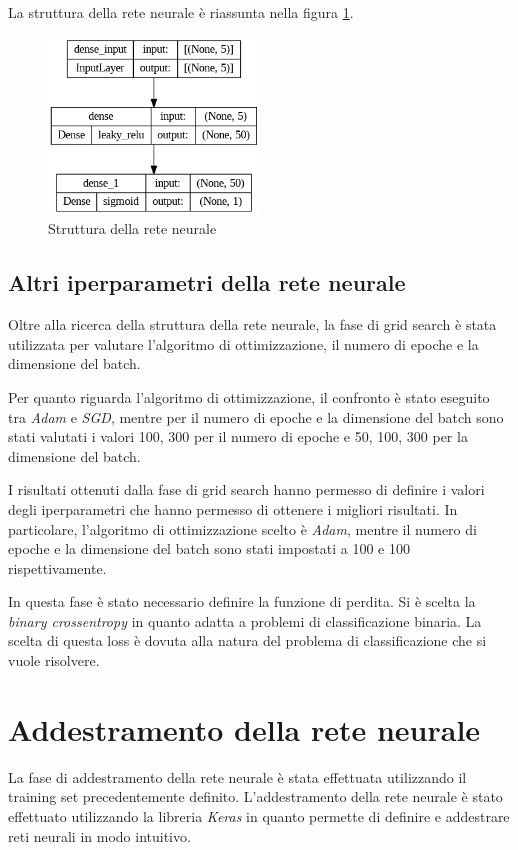 La struttura della rete neurale è riassunta nella figura \ref{fig:strutturaReteNeurale}.
\begin{figure}[!ht]
    \centering
    \includegraphics[width=0.5\textwidth]{img/rete/struttura_rete.png}
    \caption{Struttura della rete neurale}
    \label{fig:strutturaReteNeurale}
\end{figure}
\subsection*{Altri iperparametri della rete neurale} %
Oltre alla ricerca della struttura della rete neurale, la fase di grid search è
stata utilizzata per valutare l'algoritmo di ottimizzazione, il numero di epoche
e la dimensione del batch.

Per quanto riguarda l'algoritmo di ottimizzazione, il confronto è stato eseguito
tra \textit{Adam} e \textit{SGD}, mentre per il numero di epoche e la dimensione
del batch sono stati valutati i valori 100, 300 per il numero di epoche e 50,
100, 300 per la dimensione del batch.

I risultati ottenuti dalla fase di grid search hanno permesso di definire i valori
degli iperparametri che hanno permesso di ottenere i migliori risultati. In
particolare, l'algoritmo di ottimizzazione scelto è \textit{Adam}, mentre il
numero di epoche e la dimensione del batch sono stati impostati a 100 e 100
rispettivamente.

In questa fase è stato necessario definire la funzione di perdita. Si è scelta 
la \textit{binary crossentropy} in quanto adatta a problemi di classificazione 
binaria. La scelta di questa loss è dovuta alla natura del problema di 
classificazione che si vuole risolvere.
\section{Addestramento della rete neurale}
La fase di addestramento della rete neurale è stata effettuata utilizzando il
training set precedentemente definito. L'addestramento della rete neurale è stato 
effettuato utilizzando la libreria \textit{Keras} in quanto permette di definire 
e addestrare reti neurali in modo intuitivo.
